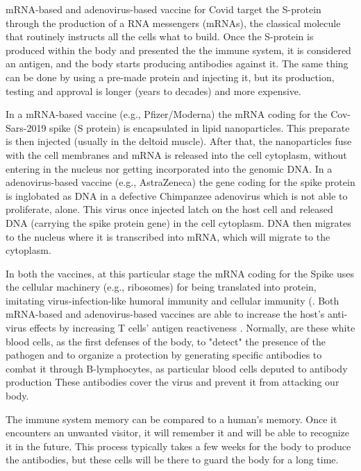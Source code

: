 \documentclass[graybox]{svmult}
\begin{document}
mRNA-based and adenovirus-based vaccine for Covid target the S-protein through the production of a RNA messengers (mRNAs), the classical molecule that routinely instructs all the cells what to build. Once the S-protein is produced within the body and presented the the immune system, it is considered an antigen, and the body starts producing antibodies against it. The same thing can be done by using a pre-made protein and injecting it, but its production, testing and approval is longer (years to decades) and more expensive.

In a mRNA-based vaccine (e.g., Pfizer/Moderna) the mRNA coding for the Cov-Sars-2019 spike (S protein)  is encapsulated in lipid nanoparticles. This preparate is then injected (usually in the deltoid muscle). After that, the nanoparticles fuse with the cell membranes and mRNA is  released into the cell cytoplasm, without entering in the nucleus nor getting incorporated into the genomic DNA. In a adenovirus-based vaccine (e.g., AstraZeneca) the gene coding for the spike protein is inglobated as DNA in a defective Chimpanzee adenovirus which is not able to proliferate, alone.  This virus once injected latch on the host cell and released DNA (carrying the spike protein gene) in the cell cytoplasm. DNA then migrates to the nucleus where it is transcribed into mRNA, which will migrate to the cytoplasm.

In both the vaccines, at this particular stage the mRNA coding for the Spike uses the cellular machinery (e.g., ribosomes) for being translated into protein, imitating virus-infection-like humoral immunity and cellular immunity (\cite{monslow2020}. Both mRNA-based and adenovirus-based vaccines are able to increase the host’s anti-virus effects by increasing T cells’ antigen reactiveness \cite{wang2021}. Normally, are these white blood cells, as the first defenses of the body, to "detect" the presence of the pathogen and to organize a protection by generating specific antibodies to combat it through B-lymphocytes, as particular blood cells deputed to antibody production \cite{ratajczak2018} These antibodies cover the virus and prevent it from attacking our body. 

The immune system memory can be compared to a human's memory. Once it encounters an unwanted visitor, it will remember it and will be able to recognize it in the future. This process typically takes a few weeks for the body to produce the antibodies, but these cells will be there to guard the body for a long time.
\end{document}

